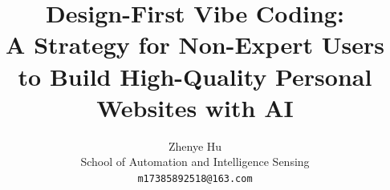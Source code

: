 \documentclass[10pt,twocolumn,letterpaper]{article}
\title{\textbf{Design-First Vibe Coding:}\\A Strategy for Non-Expert Users to Build High-Quality Personal Websites with AI}
\author{Zhenye Hu\\
School of Automation and Intelligence Sensing\\
{\tt\small m17385892518@163.com}
}
\begin{document}
\maketitle






{
    \small
    
    
}
\end{document}
